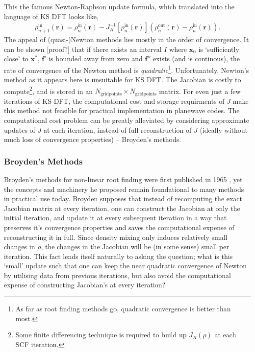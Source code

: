 This the famous Newton-Raphson update formula, which translated into the language of KS DFT looks like,
\begin{align}
\rho^{\text{in}}_{n+1}(\textbf{r}) = \rho^{\text{in}}_{n}(\textbf{r}) - J^{-1}_R[\rho^{\text{in}}_n(\textbf{r})] (\rho^{\text{out}}_n (\textbf{r}) - \rho^{\text{in}}_n (\textbf{r})). 
\end{align}
The appeal of (quasi-)Newton methods lies mostly in the order of convergence. It can be shown [proof?] that if there exists an interval $I$ where $\textbf{x}_0$ is `sufficiently close' to $\textbf{x}^*$, $\textbf{f}'$ is bounded away from zero and $\textbf{f}''$ exists (and is continous), the rate of convergence of the Newton method is \textit{quadratic}\footnote{As far as root finding methods go, quadratic convergence is better than most.}. Unfortunately, Newton's method as it appears here is unsuitable for KS DFT. The Jacobian is costly to compute\footnote{Some finite differencing technique is required to build up $J_R(\rho)$ at each SCF iteration.}, and is stored in an $N_{\text{gridpoints}} \times N_{\text{gridpoints}}$ matrix. For even just a few iterations of KS DFT, the computational cost and storage requirments of $J$ make this method not feasible for practical implementation in planewave codes. The computational cost problem can be greatly alleviated by considering approximate updates of $J$ at each iteration, instead of full reconstruction of $J$ (ideally without much loss of convergence properties) -- Broyden's methods.   

\subsubsection{Broyden's Methods}

Broyden's methods for non-linear root finding were first published in 1965 \citep{broyden}, yet the concepts and machinery he proposed remain foundational to many methods in practical use today. Broyden supposes that instead of recomputing the exact Jacobian matrix at every iteration, one can construct the Jacobian at only the initial iteration, and update it at every subsequent iteration in a way that preserves it's convergence properties and saves the computational expense of reconstructing it in full. Since density mixing only induces relatively small changes in $\rho$, the changes in the Jacobian will be (in some sense) small per iteration. This fact lends itself naturally to asking the question; what is this `small' update such that one can keep the near quadratic convergence of Newton by utilising data from previous iterations, but also avoid the computational expense of constructing Jacobian's at every iteration? 

